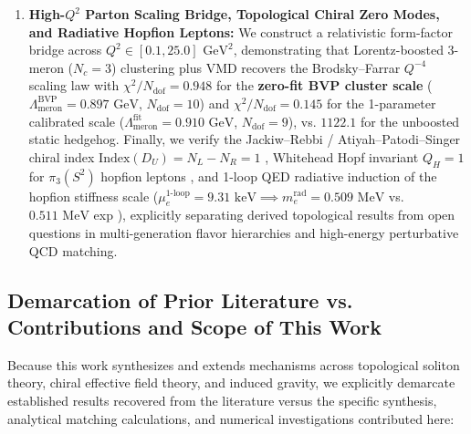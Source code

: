 \documentclass[10pt,aps,prd,twocolumn,superscriptaddress,nofootinbib,floatfix,longbibliography,showkeys]{revtex4-2}
\begin{document}
\begin{enumerate}
  \item \textbf{High-$Q^2$ Parton Scaling Bridge, Topological Chiral Zero Modes, and Radiative Hopfion Leptons:} We construct a relativistic form-factor bridge across $Q^2 \in [0.1, 25.0]\text{ GeV}^2$, demonstrating that Lorentz-boosted 3-meron ($N_c=3$) clustering plus VMD recovers the Brodsky--Farrar $Q^{-4}$ scaling law \cite{ref33,ref34} with $\chi^2/N_{\text{dof}} = 0.948$ for the \textbf{zero-fit BVP cluster scale} ($\Lambda_{\text{meron}}^{\text{BVP}} = 0.897\text{ GeV}$, $N_{\text{dof}} = 10$) and $\chi^2/N_{\text{dof}} = 0.145$ for the 1-parameter calibrated scale ($\Lambda_{\text{meron}}^{\text{fit}} = 0.910\text{ GeV}$, $N_{\text{dof}} = 9$), vs. $1122.1$ for the unboosted static hedgehog. Finally, we verify the Jackiw--Rebbi / Atiyah--Patodi--Singer chiral index $\text{Index}(D_U) = N_L - N_R = 1$ \cite{ref35,ref36,ref37}, Whitehead Hopf invariant $Q_H = 1$ \cite{ref38} for $\pi_3(S^2)$ hopfion leptons \cite{ref39,ref40,ref41,ref42}, and 1-loop QED radiative induction of the hopfion stiffness scale ($\mu_e^{\text{1-loop}} = 9.31\text{ keV} \implies m_e^{\text{rad}} = 0.509\text{ MeV}$ vs. $0.511\text{ MeV}$ exp \cite{ref19,ref20}), explicitly separating derived topological results from open questions in multi-generation flavor hierarchies and high-energy perturbative QCD matching.

\end{enumerate}

\subsection{Demarcation of Prior Literature vs. Contributions and Scope of This Work}\label{sec:1.3}

Because this work synthesizes and extends mechanisms across topological soliton theory, chiral effective field theory, and induced gravity, we explicitly demarcate established results recovered from the literature versus the specific synthesis, analytical matching calculations, and numerical investigations contributed here:
\end{document}

